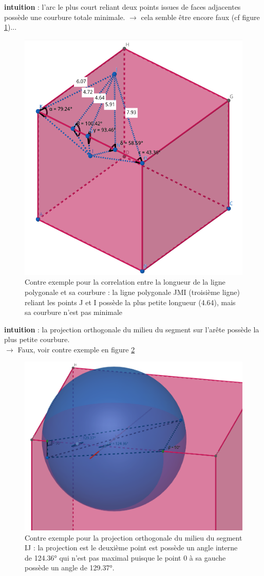 \documentclass{article}
\begin{document}
\textbf{intuition} : l'arc le plus court reliant deux points issues de faces adjacentes possède une courbure totale minimale.
$\rightarrow$ cela semble être encore faux (cf figure \ref{fig:contre_ex_1})...

\begin{figure}[!h]
    \centering
    \includegraphics[width=0.5\linewidth]{contre_ex_1.png}
    \caption{Contre exemple pour la correlation entre la longueur de la ligne polygonale et sa courbure : la ligne polygonale JMI (troisième ligne) reliant les points J et I possède la plus petite longueur (4.64), mais sa courbure n'est pas minimale}
    \label{fig:contre_ex_1}
\end{figure}

\textbf{intuition} : la projection orthogonale du milieu du segment sur l'arête possède la plus petite courbure.\\
$\rightarrow$ Faux, voir contre exemple en figure \ref{fig:contre_ex_2}

\begin{figure}[!h]
    \centering
    \includegraphics[width=0.5\linewidth]{contre_ex_2.png}
    \caption{Contre exemple pour la projection orthogonale du milieu du segment IJ : la projection est le deuxième point est possède un angle interne de 124.36° qui n'est pas maximal puisque le point 0 à sa gauche possède un angle de 129.37°.}
    \label{fig:contre_ex_2}
\end{figure}
\end{document}
